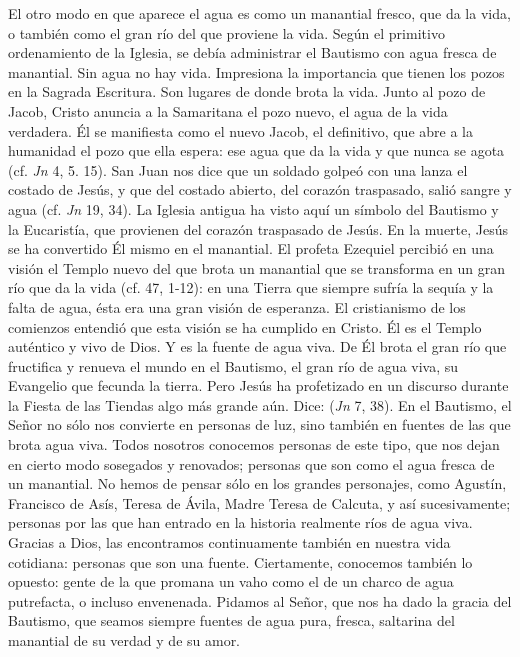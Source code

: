 \begin{body}
El otro modo en que aparece el agua es como un manantial fresco, que da la vida, o también como el gran río del que proviene la vida. Según el primitivo ordenamiento de la Iglesia, se debía administrar el Bautismo con agua fresca de manantial. Sin agua no hay vida. Impresiona la importancia que tienen los pozos en la Sagrada Escritura. Son lugares de donde brota la vida. Junto al pozo de Jacob, Cristo anuncia a la Samaritana el pozo nuevo, el agua de la vida verdadera. Él se manifiesta como el nuevo Jacob, el definitivo, que abre a la humanidad el pozo que ella espera: ese agua que da la vida y que nunca se agota (cf. \textit{Jn} 4, 5. 15). San Juan nos dice que un soldado golpeó con una lanza el costado de Jesús, y que del costado abierto, del corazón traspasado, salió sangre y agua (cf. \textit{Jn} 19, 34). La Iglesia antigua ha visto aquí un símbolo del Bautismo y la Eucaristía, que provienen del corazón traspasado de Jesús. En la muerte, Jesús se ha convertido Él mismo en el manantial. El profeta Ezequiel percibió en una visión el Templo nuevo del que brota un manantial que se transforma en un gran río que da la vida (cf. 47, 1-12): en una Tierra que siempre sufría la sequía y la falta de agua, ésta era una gran visión de esperanza. El cristianismo de los comienzos entendió que esta visión se ha cumplido en Cristo. Él es el Templo auténtico y vivo de Dios. Y es la fuente de agua viva. De Él brota el gran río que fructifica y renueva el mundo en el Bautismo, el gran río de agua viva, su Evangelio que fecunda la tierra. Pero Jesús ha profetizado en un discurso durante la Fiesta de las Tiendas algo más grande aún. Dice:  (\textit{Jn} 7, 38). En el Bautismo, el Señor no sólo nos convierte en personas de luz, sino también en fuentes de las que brota agua viva. Todos nosotros conocemos personas de este tipo, que nos dejan en cierto modo sosegados y renovados; personas que son como el agua fresca de un manantial. No hemos de pensar sólo en los grandes personajes, como Agustín, Francisco de Asís, Teresa de Ávila, Madre Teresa de Calcuta, y así sucesivamente; personas por las que han entrado en la historia realmente ríos de agua viva. Gracias a Dios, las encontramos continuamente también en nuestra vida cotidiana: personas que son una fuente. Ciertamente, conocemos también lo opuesto: gente de la que promana un vaho como el de un charco de agua putrefacta, o incluso envenenada. Pidamos al Señor, que nos ha dado la gracia del Bautismo, que seamos siempre fuentes de agua pura, fresca, saltarina del manantial de su verdad y de su amor.


\end{body}
